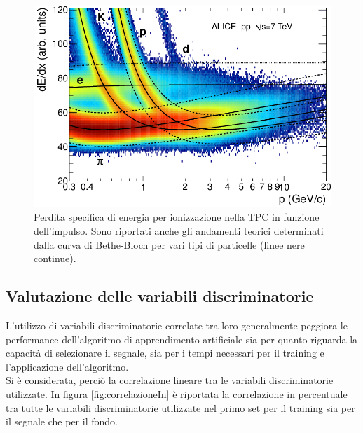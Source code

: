         
   
   \begin{figure}[htbp]
        \centering
        \includegraphics[width=0.7\linewidth]{training&testing/Specific-energy-loss-in-the-TPC.png}
        \caption{ Perdita specifica di energia per ionizzazione nella TPC in funzione dell'impulso. Sono riportati anche gli andamenti teorici determinati dalla curva di Bethe-Bloch per vari tipi di particelle (linee nere continue).}
        \label{fig:BBnellaTPC}
    \end{figure}
   
  
  \subsection{Valutazione delle variabili discriminatorie}
  
    L'utilizzo di variabili discriminatorie correlate tra loro generalmente peggiora le performance dell'algoritmo di apprendimento artificiale sia per quanto riguarda la capacit\`a di selezionare il segnale, sia per i tempi necessari per il training e l'applicazione dell'algoritmo.  
    \\Si \`e considerata, perci\`o la correlazione lineare tra le variabili discriminatorie utilizzate. In figura \ref{fig:correlazioneIn} \`e riportata la correlazione in percentuale tra tutte le variabili discriminatorie utilizzate nel primo set per il training sia per il segnale che per il fondo.
   
